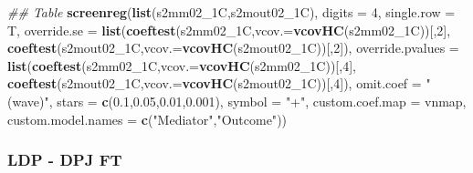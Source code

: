 \documentclass[
]{article}
\newenvironment{Shaded}{\begin{snugshade}}{\end{snugshade}}
\newcommand{\CommentTok}[1]{\textcolor[rgb]{0.56,0.35,0.01}{\textit{#1}}}
\newcommand{\DataTypeTok}[1]{\textcolor[rgb]{0.13,0.29,0.53}{#1}}
\newcommand{\DecValTok}[1]{\textcolor[rgb]{0.00,0.00,0.81}{#1}}
\newcommand{\FloatTok}[1]{\textcolor[rgb]{0.00,0.00,0.81}{#1}}
\newcommand{\KeywordTok}[1]{\textcolor[rgb]{0.13,0.29,0.53}{\textbf{#1}}}
\newcommand{\NormalTok}[1]{#1}
\newcommand{\StringTok}[1]{\textcolor[rgb]{0.31,0.60,0.02}{#1}}
\begin{document}
\begin{Shaded}
\begin{Highlighting}[]
\CommentTok{## Table}
\KeywordTok{screenreg}\NormalTok{(}\KeywordTok{list}\NormalTok{(s2mm02_1C,s2mout02_1C), }\DataTypeTok{digits =} \DecValTok{4}\NormalTok{, }\DataTypeTok{single.row =}\NormalTok{ T,}
          \DataTypeTok{override.se =} \KeywordTok{list}\NormalTok{(}\KeywordTok{coeftest}\NormalTok{(s2mm02_1C,}\DataTypeTok{vcov.=}\KeywordTok{vcovHC}\NormalTok{(s2mm02_1C))[,}\DecValTok{2}\NormalTok{],}
                             \KeywordTok{coeftest}\NormalTok{(s2mout02_1C,}\DataTypeTok{vcov.=}\KeywordTok{vcovHC}\NormalTok{(s2mout02_1C))[,}\DecValTok{2}\NormalTok{]),}
          \DataTypeTok{override.pvalues =} \KeywordTok{list}\NormalTok{(}\KeywordTok{coeftest}\NormalTok{(s2mm02_1C,}\DataTypeTok{vcov.=}\KeywordTok{vcovHC}\NormalTok{(s2mm02_1C))[,}\DecValTok{4}\NormalTok{],}
                                  \KeywordTok{coeftest}\NormalTok{(s2mout02_1C,}\DataTypeTok{vcov.=}\KeywordTok{vcovHC}\NormalTok{(s2mout02_1C))[,}\DecValTok{4}\NormalTok{]),}
          \DataTypeTok{omit.coef =} \StringTok{"(wave)"}\NormalTok{, }\DataTypeTok{stars =} \KeywordTok{c}\NormalTok{(}\FloatTok{0.1}\NormalTok{,}\FloatTok{0.05}\NormalTok{,}\FloatTok{0.01}\NormalTok{,}\FloatTok{0.001}\NormalTok{), }\DataTypeTok{symbol =} \StringTok{"+"}\NormalTok{,}
          \DataTypeTok{custom.coef.map =}\NormalTok{ vnmap, }
          \DataTypeTok{custom.model.names =} \KeywordTok{c}\NormalTok{(}\StringTok{"Mediator"}\NormalTok{,}\StringTok{"Outcome"}\NormalTok{))}
\end{Highlighting}
\end{Shaded}

\hypertarget{ldp---dpj-ft}{%
\subsubsection{LDP - DPJ FT}\label{ldp---dpj-ft}}
\end{document}
